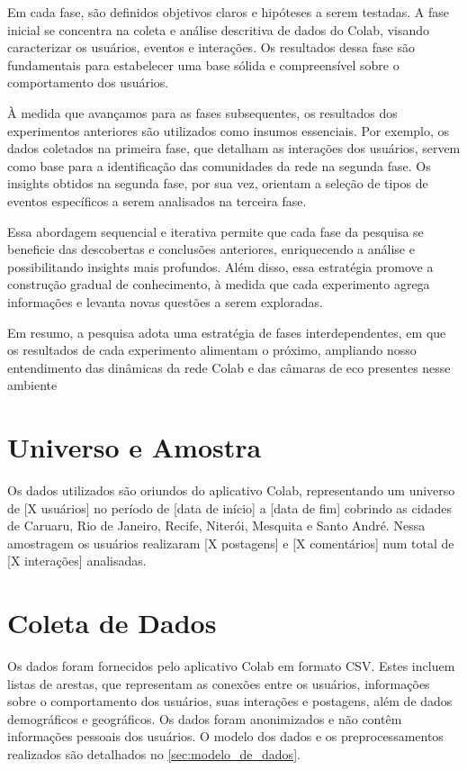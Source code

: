 Em cada fase, são definidos objetivos claros e hipóteses a serem testadas. A fase inicial se concentra na coleta e análise descritiva de dados do Colab, visando caracterizar os usuários, eventos e interações. Os resultados dessa fase são fundamentais para estabelecer uma base sólida e compreensível sobre o comportamento dos usuários.

À medida que avançamos para as fases subsequentes, os resultados dos experimentos anteriores são utilizados como insumos essenciais. Por exemplo, os dados coletados na primeira fase, que detalham as interações dos usuários, servem como base para a identificação das comunidades da rede na segunda fase. Os insights obtidos na segunda fase, por sua vez, orientam a seleção de tipos de eventos específicos a serem analisados na terceira fase.

Essa abordagem sequencial e iterativa permite que cada fase da pesquisa se beneficie das descobertas e conclusões anteriores, enriquecendo a análise e possibilitando insights mais profundos. Além disso, essa estratégia promove a construção gradual de conhecimento, à medida que cada experimento agrega informações e levanta novas questões a serem exploradas.

Em resumo, a pesquisa adota uma estratégia de fases interdependentes, em que os resultados de cada experimento alimentam o próximo, ampliando nosso entendimento das dinâmicas da rede Colab e das câmaras de eco presentes nesse ambiente

\section{Universo e Amostra}
Os dados utilizados são oriundos do aplicativo Colab, representando um universo de [X usuários] no período de [data de início] a [data de fim] cobrindo as cidades de Caruaru, Rio de Janeiro, Recife, Niterói, Mesquita e Santo André. Nessa amostragem os usuários realizaram [X postagens] e [X comentários] num total de [X interações] analisadas.

\section{Coleta de Dados}
Os dados foram fornecidos pelo aplicativo Colab em formato CSV. Estes incluem listas de arestas, que representam as conexões entre os usuários, informações sobre o comportamento dos usuários, suas interações e postagens, além de dados demográficos e geográficos. Os dados foram anonimizados e não contêm informações pessoais dos usuários. O modelo dos dados e os preprocessamentos realizados são detalhados no \autoref{sec:modelo_de_dados}.

